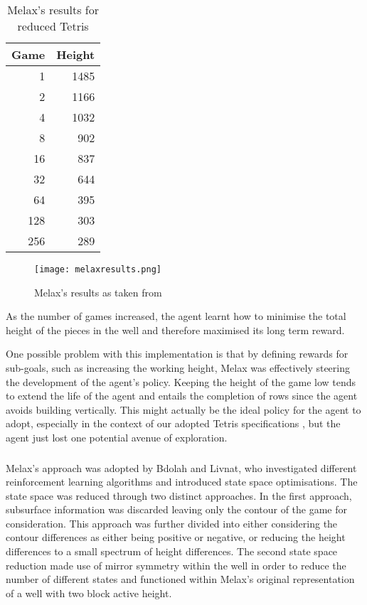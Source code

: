 \documentclass{rucsthesis}
\begin{document}
\begin{table}[h]
\centering
\begin{tabular}{|r|r|}
\hline
Game & Height  \\
\hline
    1 &  1485 \\
     2  & 1166 \\
     4  & 1032 \\
     8  &  902 \\
    16  &  837 \\
    32  &  644 \\
    64  &  395 \\
   128  &  303 \\
   256   & 289 \\
\hline
\end{tabular}
\caption{Melax's results for reduced Tetris}
\label{mresults}
\end{table}

\begin{figure}[h]
\centering
\texttt{[image: melaxresults.png]}
\caption{Melax's results as taken from \cite{melaxtetris}}
\label{fig:meres}
\end{figure}

As the number of games increased, the agent learnt how to minimise the total height of the pieces in the well and therefore maximised its long term reward.

One possible problem with this implementation is that by defining rewards for sub-goals, such as increasing the working height, Melax was effectively steering the development of the agent's policy. Keeping the height of the game low tends to extend the life of the agent and entails the completion of rows since the agent avoids building vertically. This might actually be the ideal policy for the agent to adopt, especially in the context of our adopted Tetris specifications \citep{tetstand}, but the agent just lost one potential avenue of exploration. 

\subsubsection{\cite{yaeltetris}}

Melax's approach was adopted by Bdolah and Livnat, who investigated different reinforcement learning algorithms and introduced state space optimisations. The state space was reduced through two distinct approaches. In the first approach, subsurface information was discarded leaving only the contour of the game for consideration. This approach was further divided into either considering the contour differences as either being positive or negative, or reducing the height differences to a small spectrum of height differences. The second state space reduction made use of mirror symmetry within the well in order to reduce the number of different states and functioned within Melax's original representation of a well with two block active height.
\end{document}

